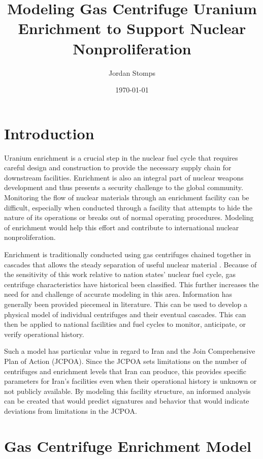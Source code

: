 \documentclass{article}
\title{Modeling Gas Centrifuge Uranium Enrichment to Support Nuclear Nonproliferation}
\author{Jordan Stomps}
\date{\today}
\begin{document}
\maketitle

\section{Introduction}

Uranium enrichment is a crucial step in the nuclear fuel cycle that requires careful design and construction to provide the necessary supply chain for downstream facilities. Enrichment is also an integral part of nuclear weapons development and thus presents a security challenge to the global community. Monitoring the flow of nuclear materials through an enrichment facility can be difficult, especially when conducted through a facility that attempts to hide the nature of its operations or breaks out of normal operating procedures. Modeling of enrichment would help this effort and contribute to international nuclear nonproliferation.

Enrichment is traditionally conducted using gas centrifuges chained together in cascades that allows the steady separation of useful nuclear material \cite{avery}. Because of the sensitivity of this work relative to nation states’ nuclear fuel cycle, gas centrifuge characteristics have historical been classified. This further increases the need for and challenge of accurate modeling in this area. Information has generally been provided piecemeal in literature. This can be used to develop a physical model of individual centrifuges and their eventual cascades. This can then be applied to national facilities and fuel cycles to monitor, anticipate, or verify operational history.

Such a model has particular value in regard to Iran and the Join Comprehensive Plan of Action (JCPOA). Since the JCPOA sets limitations on the number of centrifuges and enrichment levels that Iran can produce, this provides specific parameters for Iran’s facilities even when their operational history is unknown or not publicly available. By modeling this facility structure, an informed analysis can be created that would predict signatures and behavior that would indicate deviations from limitations in the JCPOA.

\section{Gas Centrifuge Enrichment Model}
\end{document}
